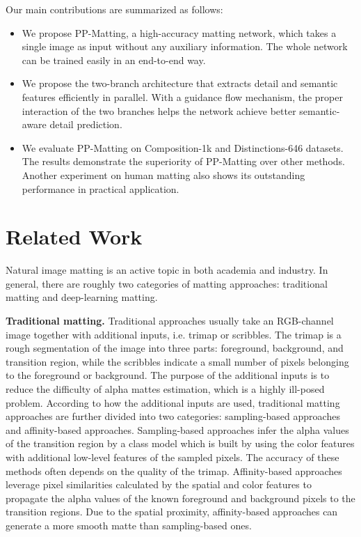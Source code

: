 \documentclass[10pt,twocolumn,letterpaper]{article}
\begin{document}
Our main contributions are summarized as follows:
\begin{itemize}
  \item We propose PP-Matting, a high-accuracy matting network, which takes a single image as input without any auxiliary information. The whole network can be trained easily in an end-to-end way.
  \item We propose the two-branch architecture that extracts detail and semantic features efficiently in parallel. With a guidance flow mechanism, the proper interaction of the two branches helps the network achieve better semantic-aware detail prediction.
  \item We evaluate PP-Matting on Composition-1k and Distinctions-646 datasets. The results demonstrate the superiority of PP-Matting over other methods. Another experiment on human matting also shows its outstanding performance in practical application.
\end{itemize}

\section{Related Work}
Natural image matting is an active topic in both academia and industry. In general, there are roughly two categories of matting approaches: traditional matting and deep-learning matting.

\textbf{Traditional matting.} Traditional approaches usually take an RGB-channel image together with additional inputs, i.e. trimap or scribbles. The trimap is a rough segmentation of the image into three parts: foreground, background, and transition region, while the scribbles indicate a small number of pixels belonging to the foreground or background. The purpose of the additional inputs is to reduce the difficulty of alpha mattes estimation, which is a highly ill-posed problem. According to how the additional inputs are used, traditional matting approaches are further divided into two categories: sampling-based approaches and affinity-based approaches. 
Sampling-based approaches \cite{chuang2001bayesian,feng2016cluster,gastal2010shared,he2011global,ruzon2000alpha} infer the alpha values of the transition region by a class model which is built by using the color features with additional low-level features of the sampled pixels. The accuracy of these methods often depends on the quality of the trimap. Affinity-based approaches \cite{aksoy2017designing,aksoy2018semantic,bai2007geodesic,chen2013knn,grady2005random,levin2007closed,levin2008spectral} leverage pixel similarities calculated by the spatial and color features to propagate the alpha values of the known foreground and background pixels to the transition regions. Due to the spatial proximity, affinity-based approaches can generate a more smooth matte than sampling-based ones.
\end{document}
